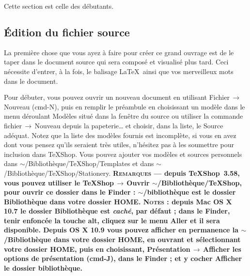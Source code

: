 \documentclass[11pt,french]{article}
\newcommand{\TS}{\textsf{\TeX Shop}}
\newcommand{\cmd}[1]{\textsf{#1}}
\newcommand{\mnu}[1]{\textsf{#1}}
\newcommand{\To}{\,\(\to\)\,}
\begin{document}

Cette section est celle des débutants.


\subsection{Édition du fichier source}

La première chose que vous ayez à faire pour créer ce grand ouvrage est de le taper dans le document source qui sera composé et visualisé plus tard. Ceci nécessite d'entrer, à la fois, le balisage \LaTeX\ ainsi que vos merveilleux mots dans le document.


Pour débuter, vous pouvez ouvrir un nouveau document en utilisant \mnu{Fichier}\To\mnu{Nouveau} \mbox{(\cmd{cmd-N})}, puis en remplir le préambule en choisissant un modèle dans le menu déroulant \mnu{Modèles} situé dans la fenêtre du source ou utiliser la commande \mnu{fichier}\To\mnu{Nouveau depuis la papeterie…} et choisir, dans la liste, le \mnu{Source} adéquat. Notez que la liste des modèles fournis est incomplète, si vous en avez dont vous pensez qu'ils seraient très utiles, n'hésitez pas à les soumettre pour inclusion dans \TS. Vous pouvez ajouter vos modèles et sources personnels dans \cmd{$\sim$/Bibliothèque/TeXShop/Templates} et dans \cmd{$\sim$/Bibliothèque/TeXShop/Stationery}. \textbf{\textsc{Remarques} ---  depuis \TS\ 3.58, vous pouvez utiliser le \mnu{TeXShop}\To\mnu{Ouvrir \cmd{$\sim$/Bibliothèque/TeXShop}}, pour ouvrir ce dossier dans le Finder : \cmd{$\sim$/bibliothèque} est le dossier \cmd{Bibliothèque} dans votre dossier \cmd{HOME}. \textsc{Notes} : depuis \textbf{Mac OS X 10.7} le dossier \cmd{Bibliothèque} est \emph{caché}, par défaut ; dans le \cmd{Finder}, tenir enfoncée la touche \cmd{alt}, cliquez sur le menu \mnu{Aller} et il sera disponible. Depuis \textbf{OS X 10.9} vous pouvez afficher en permanence la \cmd{$\sim$/Bibliothèque} dans votre dossier \cmd{HOME}, en ouvrant et sélectionnant votre dossier \cmd{HOME}, puis en choisissant, \mnu{Présentation}\To\mnu{Afficher les options de présentation} (\cmd{cmd-J}), dans le \cmd{Finder} ; et y cocher \cmd{Afficher le dossier bibliothèque}.}
\end{document}
